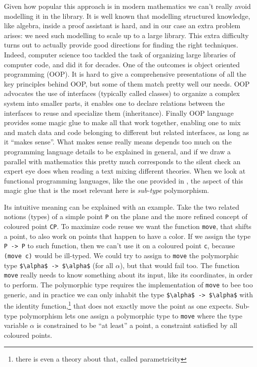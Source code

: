 Given how popular this approach is in modern mathematics we can't
really avoid modelling it in the \mcbMC{} library.  It is well known that
modelling structured knowledge, like algebra, inside a proof assistant
is hard, and in our case an extra problem arises: we need such
modelling to scale up to a large library. This extra difficulty turns
out to actually provide good directions for finding the right
techniques.  Indeed, computer science too tackled the task of
organizing large libraries of computer code, and did it for decades.
One of the outcomes is object oriented programming (OOP).
It is hard to give a comprehensive presentations of all the key
principles behind OOP, but some of them match pretty well our needs.
OOP advocates the use of interfaces (typically called classes) to
organize a complex system into smaller parts, it enables one
to declare relations between the interfaces to reuse and
specialize them (inheritance).  Finally OOP language provides some
magic glue to make all that work together, enabling one to mix and
match data and code belonging to different but related interfaces, as
long as it ``makes sense''.  What makes sense really means depends too
much on the programming language details to be explained in general,
and if we draw a parallel with mathematics this pretty much
corresponds to the silent check an expert eye does when reading a text
mixing different theories.
When we look at functional programming languages, like the one
provided in \mcbCIC{}, the aspect of this magic glue that is the most
relevant here is \emph{sub-type} polymorphism.

Its intuitive meaning can be explained with an example.  Take the two
related notions (types) of a simple point \lstinline/P/ on the plane
and the more refined concept of coloured point \lstinline/CP/.  To
maximize code reuse we want the function \lstinline/move/, that shifts
a point, to also work on points that happen to have a color.
If we assign the type \lstinline/P -> P/ to such function, then we
can't use it on a coloured point \lstinline/c/, because
\lstinline/(move c)/ would be ill-typed.
We could try to assign to \lstinline/move/ the polymorphic type
\lstinline/$\alpha$ -> $\alpha$/ (for all $\alpha$), but that would
fail too. The function \lstinline/move/ really needs to know something
about its input, like its coordinates, in order to perform.  The
polymorphic type requires the implementation of \lstinline/move/
to bee too generic, and
in practice we can only inhabit the type
\lstinline/$\alpha$ -> $\alpha$/ with the identity
function,\footnote{there is even a theory about that, called
parametricity} that does not exactly move the point as one expects.
Sub-type polymorphism lets one assign a polymorphic type to
\lstinline/move/ where the type variable $\alpha$ is constrained to be
``at least'' a point, a constraint satisfied by all coloured points.

